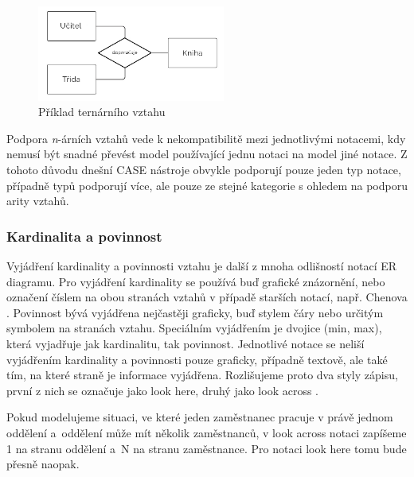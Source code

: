 \documentclass[czech,bachelor,public,dept460,male,oneside]{diploma}
\begin{document}
		\begin{figure}[!h]
			\centering
			\includegraphics[width=0.55\textwidth]{Figures/TernaryRelationship2}
			\caption{Příklad ternárního vztahu}
			\label{fig:ternaryEx}
		\end{figure}
		
		Podpora \textit{n}-árních vztahů vede k nekompatibilitě mezi jednotlivými notacemi, kdy nemusí být snadné převést model používající jednu notaci na model jiné notace. Z tohoto důvodu dnešní CASE nástroje obvykle podporují pouze jeden typ notace, případně typů podporují více, ale pouze ze stejné kategorie s ohledem na podporu arity vztahů. 
		
		\subsubsection{Kardinalita a povinnost}
		Vyjádření kardinality a povinnosti vztahu je další z mnoha odlišností notací ER diagramu. Pro vyjádření kardinality se používá buď grafické znázornění, nebo označení číslem na obou stranách vztahů v případě starších notací, např. Chenova \cite{dbVsb}. Povinnost bývá vyjádřena nejčastěji graficky, buď stylem čáry nebo určitým symbolem na stranách vztahu. Speciálním vyjádřením je dvojice (min, max), která vyjadřuje jak kardinalitu, tak povinnost. Jednotlivé notace se neliší vyjádřením kardinality a povinnosti pouze graficky, případně textově, ale také tím, na které straně je informace vyjádřena. Rozlišujeme proto dva styly zápisu, první z nich se označuje jako look here, druhý jako look across \cite{compErNotations}. 
		
		Pokud modelujeme situaci, ve které jeden zaměstnanec pracuje v právě jednom oddělení a~oddělení může mít několik zaměstnanců, v look across notaci zapíšeme 1 na stranu oddělení a~N na stranu zaměstnance. Pro notaci look here tomu bude přesně naopak. 
		
	
\end{document}
